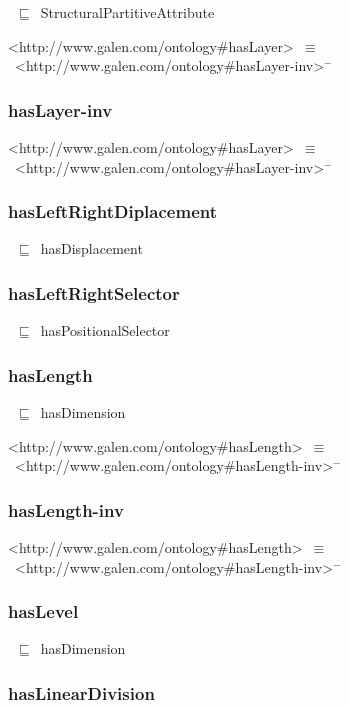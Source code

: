 \documentclass{article}
\begin{document}
~\ensuremath{\sqsubseteq}~StructuralPartitiveAttribute

<http://www.galen.com/ontology#hasLayer>~\ensuremath{\equiv}~<http://www.galen.com/ontology#hasLayer-inv>\ensuremath{^-}

\subsubsection*{hasLayer-inv}

<http://www.galen.com/ontology#hasLayer>~\ensuremath{\equiv}~<http://www.galen.com/ontology#hasLayer-inv>\ensuremath{^-}

\subsubsection*{hasLeftRightDiplacement}

~\ensuremath{\sqsubseteq}~hasDisplacement

\subsubsection*{hasLeftRightSelector}

~\ensuremath{\sqsubseteq}~hasPositionalSelector

\subsubsection*{hasLength}

~\ensuremath{\sqsubseteq}~hasDimension

<http://www.galen.com/ontology#hasLength>~\ensuremath{\equiv}~<http://www.galen.com/ontology#hasLength-inv>\ensuremath{^-}

\subsubsection*{hasLength-inv}

<http://www.galen.com/ontology#hasLength>~\ensuremath{\equiv}~<http://www.galen.com/ontology#hasLength-inv>\ensuremath{^-}

\subsubsection*{hasLevel}

~\ensuremath{\sqsubseteq}~hasDimension

\subsubsection*{hasLinearDivision}
\end{document}
